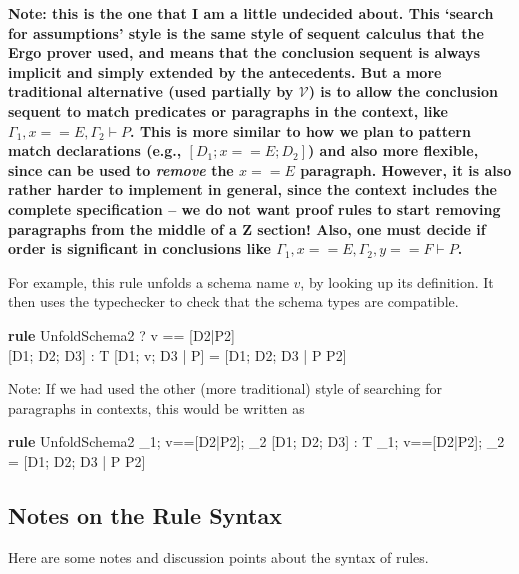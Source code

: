 \documentclass{article}
\newcommand{\V}{\mathcal{V}}
\newenvironment{zedrule}[1]{\par\textbf{rule }#1\vspace{-2ex}\infrule}{\endinfrule}
\newcommand{\derives}{\derive{}}
\newcommand{\Context}{\Gamma}
\newcommand{\proviso}{\raisebox{0.5ex}{${}_{\blacktriangleright}\ $}}%
\begin{document}
\begin{description}
  \textbf{Note: this is the one that I am a little undecided about.
  This `search for assumptions' style is the same style of sequent
  calculus that the Ergo prover used, and means that the conclusion
  sequent is always implicit and simply extended by the antecedents.
  But a more traditional alternative (used partially by $\V$)
  is to allow the conclusion
  sequent to match predicates or paragraphs in the context,
  like $\Context_1, x==E, \Context_2 \vdash P$.
  This is more similar to how we plan to pattern match declarations
  (e.g., $[D_1;x==E;D_2]$) and also more flexible,
  since can be used to \emph{remove} the $x==E$ paragraph.
  However, it is also rather harder to implement in general,
  since the context includes the complete specification -- we
  do not want proof rules to start removing paragraphs from the middle of
  a Z section!  
  Also, one must decide if order is significant in conclusions like
  $\Context_1, x==E, \Context_2, y==F \vdash P$.
  }
\end{description}

For example, this rule unfolds a schema name $v$, by looking
up its definition.  It then uses the typechecker to check that 
the schema types are compatible.

\begin{zedrule}{UnfoldSchema2}
   \proviso? v == [D2|P2] \\
   \proviso [D1; D2; D3] : T
\derives
   [D1; v; D3 | P]  =  [D1; D2; D3 | P \land P2]
\end{zedrule}

Note: If we had used the other (more traditional) style of searching
for paragraphs in contexts, this would be written as
\begin{zedrule}{UnfoldSchema2}
   \Context_1; v==[D2|P2]; \Context_2 \vdash
      \proviso [D1; D2; D3] : T
\derives
   \Context_1; v==[D2|P2]; \Context_2 \vdash
      [D1; v; D3 | P]  =  [D1; D2; D3 | P \land P2]
\end{zedrule}



\subsection{Notes on the Rule Syntax}

Here are some notes and discussion points about the syntax of rules.
\end{document}
